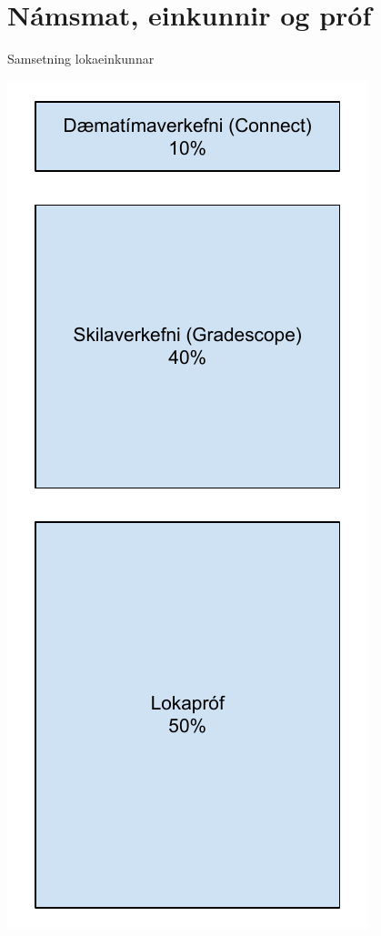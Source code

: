 \documentclass[justified, nobib]{tufte-handout}
\begin{document}
\section{Námsmat, einkunnir og próf}
\begin{marginfigure}
\caption{Samsetning lokaeinkunnar}
\includegraphics[width=\linewidth]{Pics/namsmat}
\end{marginfigure}
\end{document}
